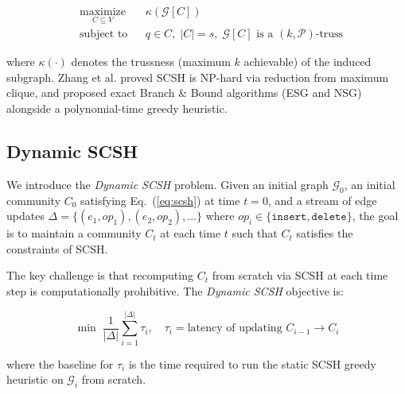 \begin{equation}
\begin{aligned}
& \underset{C \subseteq V}{\text{maximize}} & & \kappa(\mathcal{G}[C]) \\
& \text{subject to} & & q \in C,\; |C| = s,\; \mathcal{G}[C] \text{ is a } (k,\mathcal{P})\text{-truss}
\end{aligned}
\label{eq:scsh}
\end{equation}

where $\kappa(\cdot)$ denotes the trussness (maximum $k$ achievable) of the induced subgraph. Zhang et al. proved SCSH is NP-hard via reduction from maximum clique, and proposed exact Branch \& Bound algorithms (ESG and NSG) alongside a polynomial-time greedy heuristic.

\subsection{Dynamic SCSH}

We introduce the \emph{Dynamic SCSH} problem. Given an initial graph $\mathcal{G}_0$, an initial community $C_0$ satisfying Eq.~(\ref{eq:scsh}) at time $t=0$, and a stream of edge updates $\Delta = \{(e_1, op_1), (e_2, op_2), \ldots\}$ where $op_i \in \{\texttt{insert}, \texttt{delete}\}$, the goal is to maintain a community $C_t$ at each time $t$ such that $C_t$ satisfies the constraints of SCSH.

The key challenge is that recomputing $C_t$ from scratch via SCSH at each time step is computationally prohibitive. The \emph{Dynamic SCSH} objective is:

\begin{equation}
\min \; \frac{1}{|\Delta|} \sum_{i=1}^{|\Delta|} \tau_i,
\quad \tau_i = \text{latency of updating } C_{i-1} \rightarrow C_i
\label{eq:dyn_obj}
\end{equation}

where the baseline for $\tau_i$ is the time required to run the static SCSH greedy heuristic on $\mathcal{G}_i$ from scratch.
